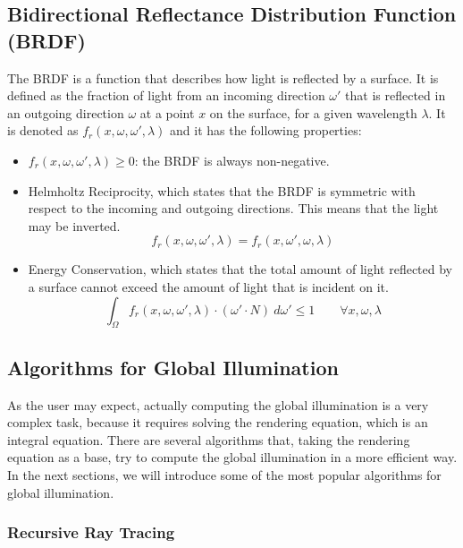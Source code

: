 \subsection{Bidirectional Reflectance Distribution Function (BRDF)}
The BRDF is a function that describes how light is reflected by a surface. It is defined as the fraction of light from an incoming direction $\omega'$ that is reflected in an outgoing direction $\omega$ at a point $x$ on the surface, for a given wavelength $\lambda$. It is denoted as $f_r(x, \omega, \omega', \lambda)$ and it has the following properties:
\begin{itemize}
    \item $f_r(x, \omega, \omega', \lambda) \geq 0$: the BRDF is always non-negative.
    \item Helmholtz Reciprocity, which states that the BRDF is symmetric with respect to the incoming and outgoing directions. This means that the light may be inverted.
    \begin{equation*}
f_r(x, \omega, \omega', \lambda) = f_r(x, \omega', \omega, \lambda)
    \end{equation*}
    \item Energy Conservation, which states that the total amount of light reflected by a surface cannot exceed the amount of light that is incident on it.
    \begin{equation*}
\int_{\Omega} f_r(x, \omega, \omega', \lambda) \cdot (\omega' \cdot N)\ d\omega' \leq 1\qquad \forall x, \omega, \lambda
    \end{equation*}
\end{itemize}

\subsection{Algorithms for Global Illumination}

As the user may expect, actually computing the global illumination is a very complex task, because it requires solving the rendering equation, which is an integral equation. There are several algorithms that, taking the rendering equation as a base, try to compute the global illumination in a more efficient way. In the next sections, we will introduce some of the most popular algorithms for global illumination.

\subsubsection{Recursive Ray Tracing}

